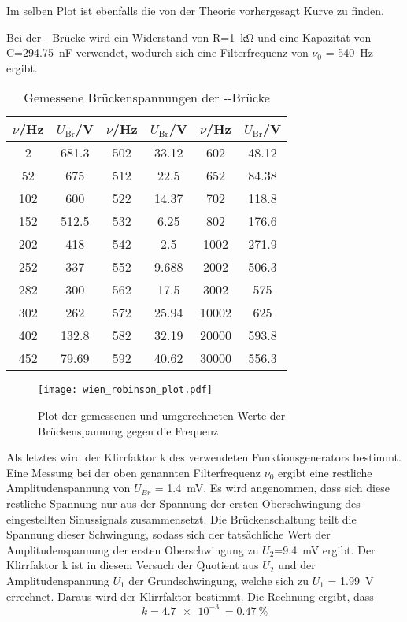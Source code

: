 Im selben Plot ist ebenfalls die von der Theorie vorhergesagt Kurve zu finden.

Bei der --Brücke wird ein Widerstand von R=\SI{1}{\kilo\ohm} und eine Kapazität von C=\SI{294.75}{\nano\farad} verwendet, wodurch sich eine Filterfrequenz von $\nu_0$ = \SI{540}{\hertz} ergibt.
%
\begin{table}[]
  \centering
  \begin{tabular}{SS|SS|SS}
     \toprule
{$\nu$/}\si{\hertz}&{$U_\text{Br}$/}\si{\volt}&{$\nu$/}\si{\hertz}&{$U_\text{Br}$/}\si{\volt}&{$\nu$/}\si{\hertz}&{$U_\text{Br}$/}\si{\volt}\\
&681.3&502&33.12&602&48.12\\
52&675&512&22.5&652&84.38\\
102	&600&522	&14.37&702&118.8\\
152&512.5&532&6.25&802&176.6\\
202&418&542&2.5&1002&271.9\\
252&337&552&9.688&2002&506.3\\
282&300&562&17.5&3002&575\\
302&262&572&25.94&10002&625\\
402	&132.8&582&32.19&20000&593.8\\
452&79.69&592&40.62&30000&556.3\\
    \bottomrule
  \end{tabular}
  \caption{Gemessene Brückenspannungen der --Brücke}
  \label{tab:wien_robinson}
\end{table}
%
\begin{figure}
\centering
\texttt{[image: wien\_robinson\_plot.pdf]}
\caption{Plot der gemessenen und umgerechneten Werte der Brückenspannung gegen die Frequenz}
\label{fig:wien_robinson_plot}
\end{figure}
%

Als letztes wird der Klirrfaktor k des verwendeten Funktionsgenerators bestimmt.
Eine Messung bei der oben genannten Filterfrequenz $\nu_0$ ergibt eine restliche Amplitudenspannung von $U_{Br}$ = \SI{1.4}{\milli\volt}. Es wird angenommen, dass sich diese restliche Spannung nur aus der Spannung der ersten Oberschwingung des eingestellten Sinussignals zusammensetzt. Die Brückenschaltung teilt die Spannung dieser Schwingung, sodass sich der tatsächliche Wert der Amplitudenspannung der ersten Oberschwingung zu $U_2$=\SI{9.4}{\milli\volt} ergibt. 
Der Klirrfaktor k ist in diesem Versuch der Quotient aus $U_2$ und der Amplitudenspannung $U_1$ der Grundschwingung, welche sich zu $U_1$ = \SI{1.99}{\volt} errechnet.
Daraus wird der Klirrfaktor bestimmt. Die Rechnung ergibt, dass
%
\begin{equation*}
k = \SI{4.7e-3}{} = \SI{0.47}{\percent}
\end{equation*}
%